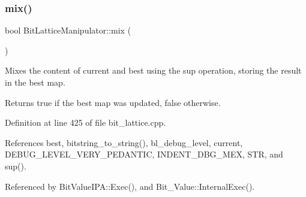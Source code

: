 \subsubsection{\texorpdfstring{mix()}{mix()}}
{\footnotesize\ttfamily bool Bit\+Lattice\+Manipulator\+::mix (\begin{DoxyParamCaption}{ }\end{DoxyParamCaption})\hspace{0.3cm}{\ttfamily [protected]}}



Mixes the content of current and best using the sup operation, storing the result in the best map. 

Returns true if the best map was updated, false otherwise. 

Definition at line 425 of file bit\+\_\+lattice.\+cpp.



References best, bitstring\+\_\+to\+\_\+string(), bl\+\_\+debug\+\_\+level, current, D\+E\+B\+U\+G\+\_\+\+L\+E\+V\+E\+L\+\_\+\+V\+E\+R\+Y\+\_\+\+P\+E\+D\+A\+N\+T\+IC, I\+N\+D\+E\+N\+T\+\_\+\+D\+B\+G\+\_\+\+M\+EX, S\+TR, and sup().



Referenced by Bit\+Value\+I\+P\+A\+::\+Exec(), and Bit\+\_\+\+Value\+::\+Internal\+Exec().

